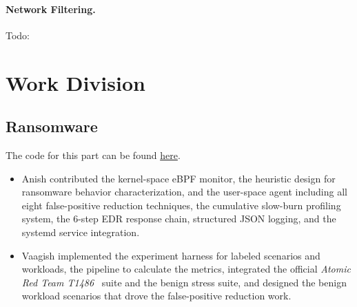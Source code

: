 \documentclass[twocolumn, 10pt]{scrartcl}
\newcommand{\todo}[1]{{\color{red} Todo: #1}}
\begin{document}
\paragraph{Network Filtering.}
\todo{}




\section{Work Division}

\subsection{Ransomware}
The code for this part can be found \href{https://github.com/AB271202/CS380S-EBPF}{here}.
\begin{itemize}
    \item Anish contributed the kernel-space eBPF monitor, the heuristic design for ransomware behavior characterization, and the user-space agent including all eight false-positive reduction techniques, the cumulative slow-burn profiling system, the 6-step EDR response chain, structured JSON logging, and the systemd service integration. 
    \item  Vaagish implemented the experiment harness for labeled scenarios and workloads, the pipeline to calculate the metrics, integrated the official \emph{Atomic Red Team T1486}~\cite{atomic_red_team_T1486} suite and the benign stress suite, and designed the benign workload scenarios that drove the false-positive reduction work.
\end{itemize}
\end{document}
